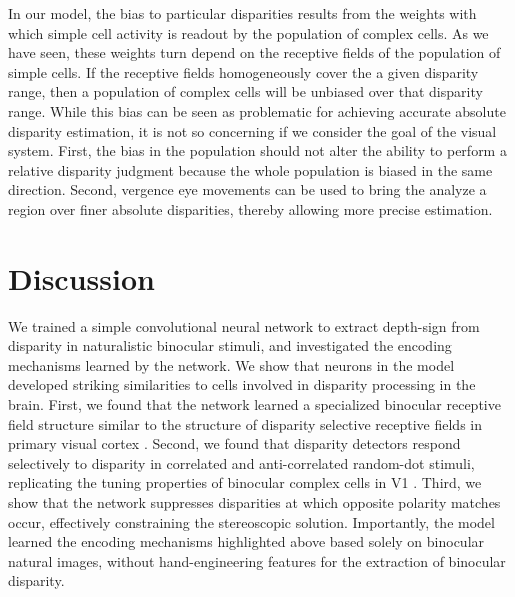 In our model, the bias to particular disparities results from the weights with which simple cell activity is readout by the population of complex cells. As we have seen, these weights turn depend on the receptive fields of the population of simple cells. If the receptive fields homogeneously cover the a given disparity range, then a population of complex cells will be unbiased over that disparity range. While this bias can be seen as problematic for achieving accurate absolute disparity estimation, it is not so concerning if we consider the goal of the visual system. First, the bias in the population should not alter the ability to perform a relative disparity judgment because the whole population is biased in the same direction.
Second, vergence eye movements can be used to bring the analyze a region over finer absolute disparities, thereby allowing more precise estimation.

\section{Discussion} %

We trained a simple convolutional neural network to extract depth-sign from disparity in naturalistic binocular stimuli, and investigated the encoding mechanisms learned by the network. We show that neurons in the model developed striking similarities to cells involved in disparity processing in the brain. First, we found that the network learned a specialized binocular receptive field structure similar to the structure of disparity selective receptive fields in primary visual cortex \cite{DeAngelis:1991mb,Tsao:2003pi}. Second, we found that disparity detectors respond selectively to disparity in correlated and anti-correlated random-dot stimuli, replicating the tuning properties of binocular complex cells in V1 \cite{Cumming:1997ve}. Third, we show that the network suppresses disparities at which opposite polarity matches occur, effectively constraining the stereoscopic solution. Importantly, the model learned the encoding mechanisms highlighted above based solely on binocular natural images, without hand-engineering features for the extraction of binocular disparity.


